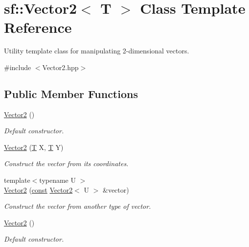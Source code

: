 \hypertarget{classsf_1_1_vector2}{\section{sf\-:\-:Vector2$<$ T $>$ Class Template Reference}
\label{classsf_1_1_vector2}
}


Utility template class for manipulating 2-\/dimensional vectors.  




{\ttfamily \#include $<$Vector2.\-hpp$>$}

\subsection*{Public Member Functions}
\begin{DoxyCompactItemize}
\item 
\hyperlink{classsf_1_1_vector2_a58c32383b5291380db4b43a289f75988}{Vector2} ()
\begin{DoxyCompactList}\small\item\em Default constructor. \end{DoxyCompactList}\item 
\hyperlink{classsf_1_1_vector2_aed26a72164e59e8a4a0aeee2049568f1}{Vector2} (\hyperlink{curses_8priv_8h_a5ef253115820acf7d27f3c5c3b02a0f0}{T} X, \hyperlink{curses_8priv_8h_a5ef253115820acf7d27f3c5c3b02a0f0}{T} Y)
\begin{DoxyCompactList}\small\item\em Construct the vector from its coordinates. \end{DoxyCompactList}\item 
{\footnotesize template$<$typename U $>$ }\\\hyperlink{classsf_1_1_vector2_a3da455e0ae3f8ff6d2fe36d10b332d10}{Vector2} (\hyperlink{term__entry_8h_a57bd63ce7f9a353488880e3de6692d5a}{const} \hyperlink{classsf_1_1_vector2}{Vector2}$<$ U $>$ \&vector)
\begin{DoxyCompactList}\small\item\em Construct the vector from another type of vector. \end{DoxyCompactList}\item 
\hyperlink{classsf_1_1_vector2_a58c32383b5291380db4b43a289f75988}{Vector2} ()
\begin{DoxyCompactList}\small\item\em Default constructor. \end{DoxyCompactList}\item 

\end{DoxyCompactItemize}
